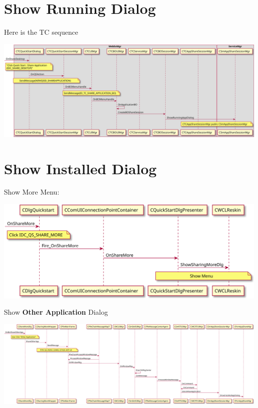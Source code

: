 \documentclass[letterpaper,10pt,english]{sphinxmanual}
\begin{document}
\section{Show Running Dialog}
\label{app_share:show-running-dialog}
Here is the TC sequence

\includegraphics{quick_start_share_application_seq.svg}


\section{Show Installed Dialog}
\label{app_share:show-installed-dialog}
Show More Menu:

\includegraphics{quick_start_share_application_more_menu_seq.svg}

Show \textbf{Other Application} Dialog

\includegraphics{quick_start_share_application_more_installed_dlg_seq.svg}
\end{document}
